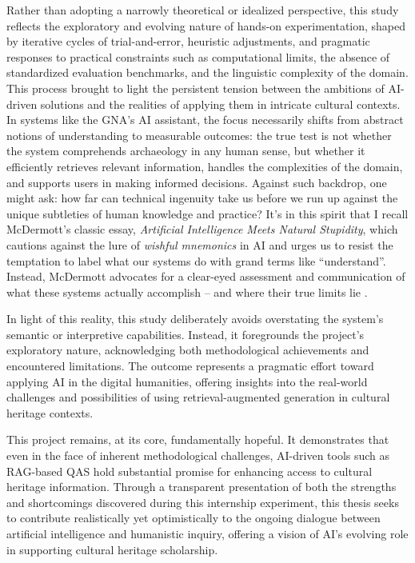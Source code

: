 \begin{spacing}{1.5}
Rather than adopting a narrowly theoretical or idealized perspective, this study reflects the exploratory and evolving nature of hands-on experimentation, shaped by iterative cycles of trial-and-error, heuristic adjustments, and pragmatic responses to practical constraints such as computational limits, the absence of standardized evaluation benchmarks, and the linguistic complexity of the domain. This process brought to light the persistent tension between the ambitions of AI-driven solutions and the realities of applying them in intricate cultural contexts. In systems like the GNA’s AI assistant, the focus necessarily shifts from abstract notions of understanding to measurable outcomes: the true test is not whether the system comprehends archaeology in any human sense, but whether it efficiently retrieves relevant information, handles the complexities of the domain, and supports users in making informed decisions. Against such backdrop, one might ask: how far can technical ingenuity take us before we run up against the unique subtleties of human knowledge and practice? It’s in this spirit that I recall McDermott’s classic essay, \textit{Artificial Intelligence Meets Natural Stupidity}, which cautions against the lure of \textit{wishful mnemonics} in AI and urges us to resist the temptation to label what our systems do with grand terms like “understand”. Instead, McDermott advocates for a clear-eyed assessment and communication of what these systems actually accomplish -- and where their true limits lie \citep{mcdermott_artificial_1976}.

In light of this reality, this study deliberately avoids overstating the system’s semantic or interpretive capabilities. Instead, it foregrounds the project’s exploratory nature, acknowledging both methodological achievements and encountered limitations. The outcome represents a pragmatic effort toward applying AI in the digital humanities, offering insights into the real-world challenges and possibilities of using retrieval-augmented generation in cultural heritage contexts.

This project remains, at its core, fundamentally hopeful. It demonstrates that even in the face of inherent methodological challenges, AI-driven tools such as RAG-based QAS hold substantial promise for enhancing access to cultural heritage information. Through a transparent presentation of both the strengths and shortcomings discovered during this internship experiment, this thesis seeks to contribute realistically yet optimistically to the ongoing dialogue between artificial intelligence and humanistic inquiry, offering a vision of AI’s evolving role in supporting cultural heritage scholarship.

\end{spacing}